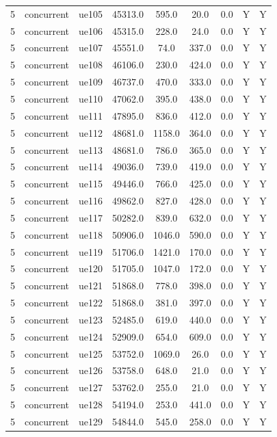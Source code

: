 \begin{table}[ht]
\begin{tabular}{|c|c|c|c|c|c|c|c|c|}
5 & concurrent & ue105 & 45313.0 & 595.0 & 20.0 & 0.0 & Y & Y \\
5 & concurrent & ue106 & 45315.0 & 228.0 & 24.0 & 0.0 & Y & Y \\
5 & concurrent & ue107 & 45551.0 & 74.0 & 337.0 & 0.0 & Y & Y \\
5 & concurrent & ue108 & 46106.0 & 230.0 & 424.0 & 0.0 & Y & Y \\
5 & concurrent & ue109 & 46737.0 & 470.0 & 333.0 & 0.0 & Y & Y \\
5 & concurrent & ue110 & 47062.0 & 395.0 & 438.0 & 0.0 & Y & Y \\
5 & concurrent & ue111 & 47895.0 & 836.0 & 412.0 & 0.0 & Y & Y \\
5 & concurrent & ue112 & 48681.0 & 1158.0 & 364.0 & 0.0 & Y & Y \\
5 & concurrent & ue113 & 48681.0 & 786.0 & 365.0 & 0.0 & Y & Y \\
5 & concurrent & ue114 & 49036.0 & 739.0 & 419.0 & 0.0 & Y & Y \\
5 & concurrent & ue115 & 49446.0 & 766.0 & 425.0 & 0.0 & Y & Y \\
5 & concurrent & ue116 & 49862.0 & 827.0 & 428.0 & 0.0 & Y & Y \\
5 & concurrent & ue117 & 50282.0 & 839.0 & 632.0 & 0.0 & Y & Y \\
5 & concurrent & ue118 & 50906.0 & 1046.0 & 590.0 & 0.0 & Y & Y \\
5 & concurrent & ue119 & 51706.0 & 1421.0 & 170.0 & 0.0 & Y & Y \\
5 & concurrent & ue120 & 51705.0 & 1047.0 & 172.0 & 0.0 & Y & Y \\
5 & concurrent & ue121 & 51868.0 & 778.0 & 398.0 & 0.0 & Y & Y \\
5 & concurrent & ue122 & 51868.0 & 381.0 & 397.0 & 0.0 & Y & Y \\
5 & concurrent & ue123 & 52485.0 & 619.0 & 440.0 & 0.0 & Y & Y \\
5 & concurrent & ue124 & 52909.0 & 654.0 & 609.0 & 0.0 & Y & Y \\
5 & concurrent & ue125 & 53752.0 & 1069.0 & 26.0 & 0.0 & Y & Y \\
5 & concurrent & ue126 & 53758.0 & 648.0 & 21.0 & 0.0 & Y & Y \\
5 & concurrent & ue127 & 53762.0 & 255.0 & 21.0 & 0.0 & Y & Y \\
5 & concurrent & ue128 & 54194.0 & 253.0 & 441.0 & 0.0 & Y & Y \\
5 & concurrent & ue129 & 54844.0 & 545.0 & 258.0 & 0.0 & Y & Y \\

\end{tabular}
\end{table}
